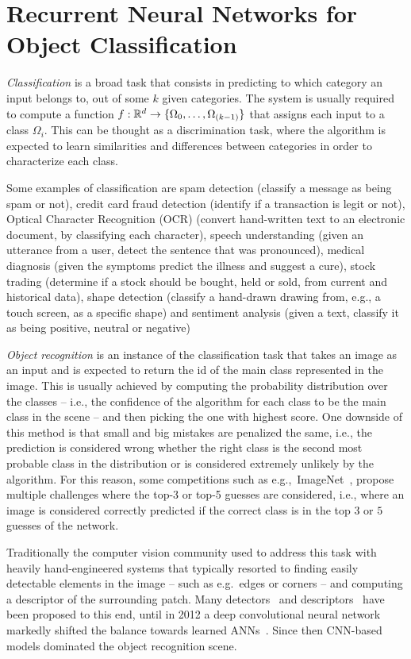 \chapter{Recurrent Neural Networks for Object Classification}\label{sec:renet}

\emph{Classification} is a broad task that consists in predicting to which
category an input belongs to, out of some $k$ given categories. The system is
usually required to compute a function $f: \mathbb{R}^d \to \{\Omega_0, \dots,
\Omega_{(k-1)}\}$ that assigns each input to a class $\Omega_i$. This can be
thought as a discrimination task, where the algorithm is expected to learn
similarities and differences between categories in order to characterize each
class.

Some examples of classification are spam detection (classify a message as being
spam or not), credit card fraud detection (identify if a transaction is legit
or not), Optical Character Recognition (OCR) (convert hand-written text to an
electronic document, by classifying each character), speech understanding
(given an utterance from a user, detect the sentence that was pronounced),
medical diagnosis (given the symptoms predict the illness and suggest a cure),
stock trading (determine if a stock should be bought, held or sold, from
current and historical data), shape detection (classify a hand-drawn drawing
from, e.g., a touch screen, as a specific shape) and sentiment analysis (given
a text, classify it as being positive, neutral or negative)

\emph{Object recognition} is an instance of the classification task that takes
an image as an input and is expected to return the id of the main class
represented in the image. This is usually achieved by computing the probability
distribution over the classes -- i.e., the confidence of the algorithm for each
class to be the main class in the scene -- and then picking the one with
highest score. One downside of this method is that small and big mistakes are
penalized the same, i.e., the prediction is considered wrong whether the right
class is the second most probable class in the distribution or is considered
extremely unlikely by the algorithm. For this reason, some competitions such as
e.g.,~ImageNet~\citep{imagenet_cvpr09, ILSVRCarxiv14}, propose multiple
challenges where the top-3 or top-5 guesses are considered, i.e., where an
image is considered correctly predicted if the correct class is in the top $3$
or $5$ guesses of the network.

Traditionally the computer vision community used to address this task with
heavily hand-engineered systems that typically resorted to finding easily
detectable elements in the image -- such as e.g.\ edges or corners -- and
computing a descriptor of the surrounding patch. Many detectors~\citep{
dufournaud2000matching,harris1988combined,mikolajczyk2001indexing,
lowe2004distinctive,mikolajczyk2005performance} and descriptors~\citep{
lowe1999object,mikolajczyk2005performance,belongie2002shape} have been proposed
to this end, until in 2012 a deep convolutional neural network markedly shifted
the balance towards learned ANNs~\citep{Krizhevsky-2012}. Since then CNN-based
models dominated the object recognition scene.

